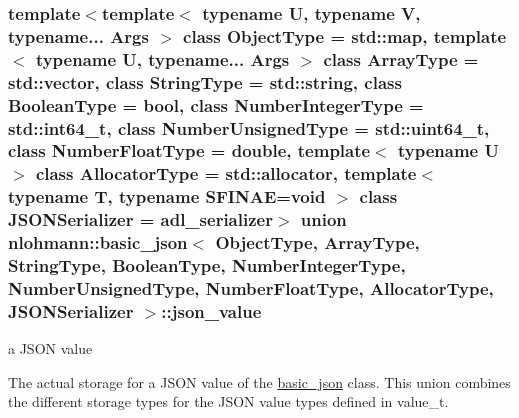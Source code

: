 \subsubsection*{template$<$template$<$ typename U, typename V, typename... Args $>$ class Object\+Type = std\+::map, template$<$ typename U, typename... Args $>$ class Array\+Type = std\+::vector, class String\+Type = std\+::string, class Boolean\+Type = bool, class Number\+Integer\+Type = std\+::int64\+\_\+t, class Number\+Unsigned\+Type = std\+::uint64\+\_\+t, class Number\+Float\+Type = double, template$<$ typename U $>$ class Allocator\+Type = std\+::allocator, template$<$ typename T, typename S\+F\+I\+N\+A\+E=void $>$ class J\+S\+O\+N\+Serializer = adl\+\_\+serializer$>$\newline
union nlohmann\+::basic\+\_\+json$<$ Object\+Type, Array\+Type, String\+Type, Boolean\+Type, Number\+Integer\+Type, Number\+Unsigned\+Type, Number\+Float\+Type, Allocator\+Type, J\+S\+O\+N\+Serializer $>$\+::json\+\_\+value}

a J\+S\+ON value 

The actual storage for a J\+S\+ON value of the \mbox{\hyperlink{classnlohmann_1_1basic__json}{basic\+\_\+json}} class. This union combines the different storage types for the J\+S\+ON value types defined in value\+\_\+t.

